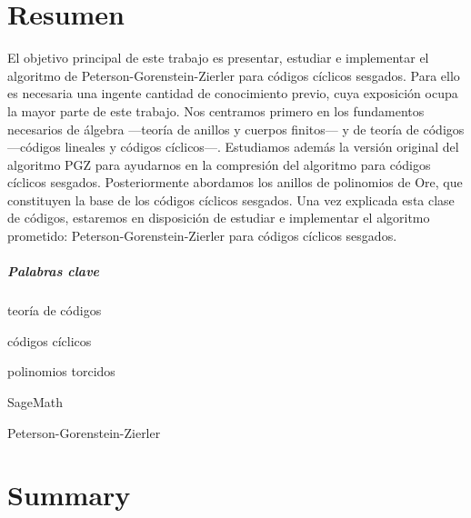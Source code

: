 \chapter*{Resumen}

El objetivo principal de este trabajo es presentar, estudiar e implementar el algoritmo de Peterson-Gorenstein-Zierler para códigos cíclicos sesgados.
Para ello es necesaria una ingente cantidad de conocimiento previo, cuya exposición ocupa la mayor parte de este trabajo.
Nos centramos primero en los fundamentos necesarios de álgebra —teoría de anillos y cuerpos finitos— y de teoría de códigos —códigos lineales y códigos cíclicos—.
Estudiamos además la versión original del algoritmo PGZ para ayudarnos en la compresión del algoritmo para códigos cíclicos sesgados.
Posteriormente abordamos los anillos de polinomios de Ore, que constituyen la base de los códigos cíclicos sesgados.
Una vez explicada esta clase de códigos, estaremos en disposición de estudiar e implementar el algoritmo prometido: Peterson-Gorenstein-Zierler para códigos cíclicos sesgados.

\paragraph{Palabras clave}
\begin{itemize*}[label=,itemsep=4em,itemjoin=\hspace{2em}]
  \item teoría de códigos
  \item códigos cíclicos
  \item polinomios torcidos
  \item SageMath
  \item Peterson-Gorenstein-Zierler
\end{itemize*}

\chapter*{Summary}

